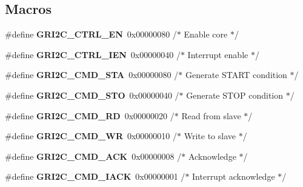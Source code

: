 \subsection*{Macros}
\begin{DoxyCompactItemize}
\item 
\mbox{\label{group__i2c_ga16a8f1175d937f663add82b0ed1096d0}} 
\#define {\bfseries G\+R\+I2\+C\+\_\+\+C\+T\+R\+L\+\_\+\+EN}~0x00000080 /$\ast$ Enable core $\ast$/
\item 
\mbox{\label{group__i2c_ga8d01eb93d82d8f438422492d1ee0df4a}} 
\#define {\bfseries G\+R\+I2\+C\+\_\+\+C\+T\+R\+L\+\_\+\+I\+EN}~0x00000040 /$\ast$ Interrupt enable $\ast$/
\item 
\mbox{\label{group__i2c_ga1fdb604c4d51f801f34e113cc7121415}} 
\#define {\bfseries G\+R\+I2\+C\+\_\+\+C\+M\+D\+\_\+\+S\+TA}~0x00000080 /$\ast$ Generate S\+T\+A\+R\+T condition $\ast$/
\item 
\mbox{\label{group__i2c_gad5596be6e4db7b3110dc359df342385b}} 
\#define {\bfseries G\+R\+I2\+C\+\_\+\+C\+M\+D\+\_\+\+S\+TO}~0x00000040 /$\ast$ Generate S\+T\+O\+P condition $\ast$/
\item 
\mbox{\label{group__i2c_ga4cabc92a90be5ceb2b2f1f8a96cd0008}} 
\#define {\bfseries G\+R\+I2\+C\+\_\+\+C\+M\+D\+\_\+\+RD}~0x00000020 /$\ast$ Read from slave $\ast$/
\item 
\mbox{\label{group__i2c_ga332560e617c7e145672dedc332607628}} 
\#define {\bfseries G\+R\+I2\+C\+\_\+\+C\+M\+D\+\_\+\+WR}~0x00000010 /$\ast$ Write to slave $\ast$/
\item 
\mbox{\label{group__i2c_ga6c1ec8e1b46819bea2b87080520623ce}} 
\#define {\bfseries G\+R\+I2\+C\+\_\+\+C\+M\+D\+\_\+\+A\+CK}~0x00000008 /$\ast$ Acknowledge $\ast$/
\item 
\mbox{\label{group__i2c_gade54cebe87ef8d35f28b7f4a757a610f}} 
\#define {\bfseries G\+R\+I2\+C\+\_\+\+C\+M\+D\+\_\+\+I\+A\+CK}~0x00000001 /$\ast$ Interrupt acknowledge $\ast$/
\item 
\mbox{\label{group__i2c_ga6d0c71c2b2a30d6c92748a7112a59f7f}} 

\end{DoxyCompactItemize}
